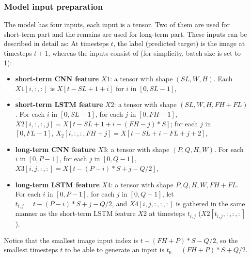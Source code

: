 \subsubsection{Model input preparation}
\label{model-input-prep}
The model has four inputs, each input is a tensor. Two of them are used for short-term part and the remains are used for long-term part. These inputs can be described in detail as: At timesteps $t$, the label (predicted target) is the image at timesteps $t + 1$, whereas the inputs consist of (for simplicity, batch size is set to 1):
\begin{itemize}
    \item \textbf{short-term CNN feature} $X1$: a tensor with shape $(SL, W, H)$. Each $X1[i,:,:]$ is $X[t - SL + 1 + i]$ for $i$ in $[0, SL - 1]$,
    \item \textbf{short-term LSTM feature} $X2$: a tensor with shape $(SL, W, H, FH+FL)$. For each $i$ in $[0, SL - 1]$, for each $j$ in $[0, FH - 1]$, $X2[i,:,:,j] = X[t - SL + 1 + i - (FH - j)*S]$; for each $j$ in $[0, FL - 1]$, $X_2[i,:,:,FH + j] = X[t - SL + i - FL + j + 2]$,
    \item \textbf{long-term CNN feature} $X3$: a tensor with shape $(P, Q, H, W)$. For each $i$ in $[0, P - 1]$, for each $j$ in $[0, Q - 1]$, $X3[i,j,:,:] = X[t - (P - i)*S + j - Q/2]$, 
    \item \textbf{long-term LSTM feature} $X4$: a tensor with shape $P, Q, H, W, FH + FL$. For each $i$ in $[0, P - 1]$, for each $j$ in $[0, Q - 1]$, let $t_{i, j} = t - (P - i)*S + j - Q/2$, and $X4[i,j, :, :, :]$ is gathered in the same manner as the short-term LSTM feature $X2$ at timesteps $t_{i,j}$ ($X2[t_{i,j},:,:,:]$). 
\end{itemize}
Notice that the smallest image input index is $t - (FH + P)*S - Q/2$, so the smallest timesteps $t$ to be able to generate an input is $t_0 = (FH + P)*S + Q/2$.

